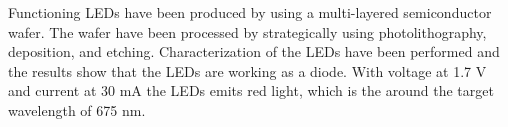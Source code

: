 



Functioning LEDs have been produced by using a multi-layered semiconductor wafer.
The wafer have been processed by strategically using photolithography, deposition, and etching.
Characterization of the LEDs have been performed and the results show that the LEDs are working as a diode.
With voltage at 1.7 V and current at 30 mA the LEDs emits red light, which is the around the target wavelength of 675 nm.